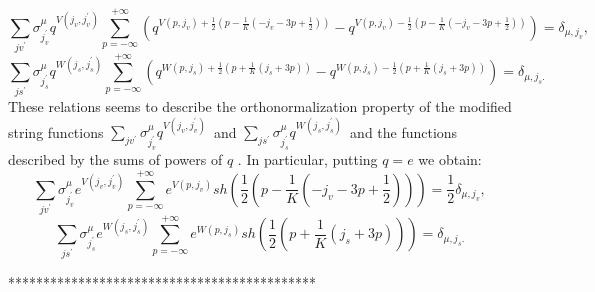 \documentclass{article}
\begin{document}
\begin{equation*}
\sum_{jv^{\prime }}\sigma _{j_{v}^{\prime }}^{\mu }q^{V\left(
j_{v},j_{v}^{\prime }\right) }\sum_{p=-\infty }^{+\infty }\left( q^{V\left(
p,j_{v}\right) +\frac{1}{2}\left( p-\frac{1}{K}\left( -j_{v}-3p+\frac{1}{2}%
\right) \right) }-q^{V\left( p,j_{v}\right) -\frac{1}{2}\left( p-\frac{1}{K}%
\left( -j_{v}-3p+\frac{1}{2}\right) \right) }\right) =\delta _{\mu ,j_{v}},
\end{equation*}
\begin{equation*}
\sum_{js^{\prime }}\sigma _{j_{s}^{\prime }}^{\mu }q^{W\left(
j_{s},j_{s}^{\prime }\right) }\sum_{p=-\infty }^{+\infty }\left( q^{W\left(
p,j_{s}\right) +\frac{1}{2}\left( p+\frac{1}{K}\left( j_{s}+3p\right)
\right) }-q^{W\left( p,j_{s}\right) -\frac{1}{2}\left( p+\frac{1}{K}\left(
j_{s}+3p\right) \right) }\right) =\delta _{\mu ,j_{s}.}
\end{equation*}
These relations seems to describe the orthonormalization property of the
modified string functions $\sum_{jv^{\prime }}\sigma _{j_{v}^{\prime }}^{\mu
}q^{V\left( j_{v},j_{v}^{\prime }\right) }$\ and $\sum_{js^{\prime }}\sigma
_{j_{s}^{\prime }}^{\mu }q^{W\left( j_{s},j_{s}^{\prime }\right) }$\ and the
functions described by the sums of powers of $q$ . In particular, putting $%
q=e$ we obtain:
\begin{equation*}
\sum_{jv^{\prime }}\sigma _{j_{v}^{\prime }}^{\mu }e^{V\left(
j_{v},j_{v}^{\prime }\right) }\sum_{p=-\infty }^{+\infty }e^{V\left(
p,j_{v}\right) }sh\left( \frac{1}{2}\left( p-\frac{1}{K}\left( -j_{v}-3p+%
\frac{1}{2}\right) \right) \right) =\frac{1}{2}\delta _{\mu ,j_{v}},
\end{equation*}
\begin{equation*}
\sum_{js^{\prime }}\sigma _{j_{s}^{\prime }}^{\mu }e^{W\left(
j_{s},j_{s}^{\prime }\right) }\sum_{p=-\infty }^{+\infty }e^{W\left(
p,j_{s}\right) }sh\left( \frac{1}{2}\left( p+\frac{1}{K}\left(
j_{s}+3p\right) \right) \right) =\delta _{\mu ,j_{s}.}
\end{equation*}

********************************************
\end{document}
